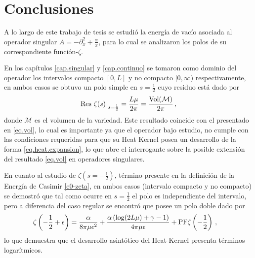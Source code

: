 \chapter{Conclusiones}

A lo largo de este trabajo de tesis se estudió la energía de vacío asociada al operador singular $A = - \partial ^2 _x + \frac{\alpha}{x} $, para lo cual se analizaron los polos de su correspondiente función-$\zeta$.

En los capítulos \ref{cap.singular} y \ref{cap.continuo} se tomaron como dominio del operador los intervalos compacto $[0,L]$ y no compacto $[0, \infty)$ respectivamente, en ambos casos se obtuvo un polo simple en $s = \frac{1}{2}$ cuyo residuo está dado por
\begin{equation}
{\rm Res } \ \zeta (s) \big|_{s = \frac{1}{2}}
= \frac{L \mu}{2 \pi} 
= \frac{ {\rm Vol (\mathcal{M})} }{2 \pi} 
\, ,
\end{equation}
donde $\mathcal{M}$ es el volumen de la variedad. Este resultado coincide con el presentado en \eqref{eq.vol}, lo cual es importante ya que el operador bajo estudio, no cumple con las condiciones requeridas para que su Heat Kernel posea un desarrollo de la forma \eqref{eq.heat.expansion}, lo que abre el interrogante sobre la posible extensión del resultado \eqref{eq.vol} en operadores singulares.



En cuanto al estudio de $\zeta (s= -\frac{1}{2} )$, término presente en la definición de la Energía de Casimir \eqref{e0-zeta}, en ambos casos (intervalo compacto y no compacto) se demostró que tal como ocurre en $s= \frac{1}{2}$ el polo es independiente del intervalo, pero a diferencia del caso regular se encontró que posee un polo doble dado por
\begin{align*}
&
	\zeta \left( - \frac{1}{2} + \epsilon \right) = 
	\frac{\alpha}{8 \pi \mu  \epsilon  ^2} +
	\frac{\alpha \left( \log (2 L \mu ) + \gamma -1  \right)}{4 \pi \mu  \epsilon } +
	{\rm PF } \zeta \left( - \frac{1}{2} \right)
\, ,
\end{align*}
lo que demuestra que el desarrollo asintótico del Heat-Kernel presenta términos logarítmicos. 


